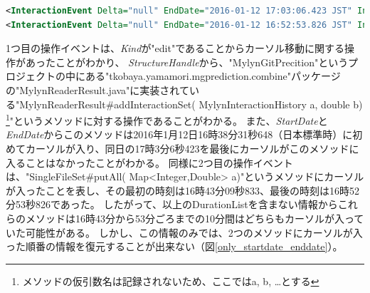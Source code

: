 \documentclass[a4paper]{jsbook}
\begin{document}
\begin{lstlisting}[float, floatplacement=tb, style=normalsize, language=xml, caption=拡張されたMylynによって記録されたMylynログの例（ただしXML上で実体参照に変換された文字はもとに戻している）, label=durationlist_fig]
<InteractionEvent Delta="null" EndDate="2016-01-12 17:03:06.423 JST" Interest="15.0" Kind="edit" Navigation="null" OriginId="org.eclipse.jdt.ui.CompilationUnitEditor" StartDate="2016-01-12 16:38:31.648 JST" StructureHandle="=MylynGitPrediction/src<tkobaya.yamamori.mgprediction.combine{MylynReaderResult.java[MylynReaderResult~ addInteractionSet~QMylynInteractionHistory;~D" StructureKind="java" NumEvents="15" CreationCount="103" DurationList= "[2016-01-12 16:38:31.648 JST/2016-01-12 16:40:16.482 JST/modified, 2016-01-12 17:02:58.409 JST/2016-01-12 17:03:06.423 JST/modified]"/>
<InteractionEvent Delta="null" EndDate="2016-01-12 16:52:53.826 JST" Interest="29.0" Kind="edit" Navigation="null" OriginId="org.eclipse.jdt.ui.CompilationUnitEditor" StartDate="2016-01-12 16:43:09.833 JST" StructureHandle="= MylynGitPrediction/src<tkobaya.yamamori.mgprediction.combine{SingleFileSet.java[SingleFileSet~putAll~QMap<+QInteger;+QDouble;>;" StructureKind="java" NumEvents="29" CreationCount="157" DurationList=" [2016-01-12 16:43:09.833 JST/2016-01-12 16:43:11.666 JST/referred, 2016-01-12 16:51:14.131 JST/2016-01-12 16:51:14.131 JST/referred, 2016-01-12 16:51:38.25 JST/2016-01-12 16:52:53.826 JST/modified]"/>
\end{lstlisting}

1つ目の操作イベントは、{\it Kind}が"edit"であることからカーソル移動に関する操作があったことがわかり、
{\it StructureHandle}から、"MylynGitPrecition"というプロジェクトの中にある\newline"tkobaya.yamamori.mgprediction.combine"パッケージの"MylynReaderResult.java"に実装されている"MylynReaderResult\#addInteractionSet( MylynInteractionHistory a, double b)
\footnote{メソッドの仮引数名は記録されないため、ここではa, b, \dots とする}"というメソッドに対する操作であることがわかる。
また、{\it StartDate}と{\it EndDate}からこのメソッドは2016年1月12日16時38分31秒648（日本標準時）に初めてカーソルが入り、同日の17時3分6秒423を最後にカーソルがこのメソッドに入ることはなかったことがわかる。
同様に2つ目の操作イベントは、"SingleFileSet\#putAll( Map<Integer,Double> a)"というメソッドにカーソルが入ったことを表し、その最初の時刻は16時43分09秒833、最後の時刻は16時52分53秒826であった。
したがって、以上のDurationListを含まない情報からこれらのメソッドは16時43分から53分ごろまでの10分間はどちらもカーソルが入っていた可能性がある。
しかし、この情報のみでは、2つのメソッドにカーソルが入った順番の情報を復元することが出来ない（図\ref{only_startdate_enddate}）。
\end{document}
